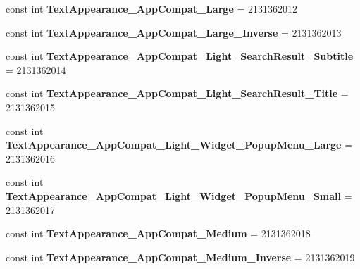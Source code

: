 \begin{DoxyCompactItemize}
\item 
\mbox{\label{classXaria_1_1Resource_1_1Style_adee01bac0b94e847200be1e34486bc75}} 
const int {\bfseries Text\+Appearance\+\_\+\+App\+Compat\+\_\+\+Large} = 2131362012
\item 
\mbox{\label{classXaria_1_1Resource_1_1Style_a69f6e5858e877fd085a7b790faa83b66}} 
const int {\bfseries Text\+Appearance\+\_\+\+App\+Compat\+\_\+\+Large\+\_\+\+Inverse} = 2131362013
\item 
\mbox{\label{classXaria_1_1Resource_1_1Style_a8970db975d003c7dd246b4aed41eb81a}} 
const int {\bfseries Text\+Appearance\+\_\+\+App\+Compat\+\_\+\+Light\+\_\+\+Search\+Result\+\_\+\+Subtitle} = 2131362014
\item 
\mbox{\label{classXaria_1_1Resource_1_1Style_a8789a5f17154f02872bf44ca2e65a2c7}} 
const int {\bfseries Text\+Appearance\+\_\+\+App\+Compat\+\_\+\+Light\+\_\+\+Search\+Result\+\_\+\+Title} = 2131362015
\item 
\mbox{\label{classXaria_1_1Resource_1_1Style_adaaaeb53b50517d52594d48f1a63f288}} 
const int {\bfseries Text\+Appearance\+\_\+\+App\+Compat\+\_\+\+Light\+\_\+\+Widget\+\_\+\+Popup\+Menu\+\_\+\+Large} = 2131362016
\item 
\mbox{\label{classXaria_1_1Resource_1_1Style_a4c80d173f319128b4d07390c6f9ad96c}} 
const int {\bfseries Text\+Appearance\+\_\+\+App\+Compat\+\_\+\+Light\+\_\+\+Widget\+\_\+\+Popup\+Menu\+\_\+\+Small} = 2131362017
\item 
\mbox{\label{classXaria_1_1Resource_1_1Style_a90c1c66755bc09b0895108db43934533}} 
const int {\bfseries Text\+Appearance\+\_\+\+App\+Compat\+\_\+\+Medium} = 2131362018
\item 
\mbox{\label{classXaria_1_1Resource_1_1Style_a259326d4529116808dd7ff38c4daf858}} 
const int {\bfseries Text\+Appearance\+\_\+\+App\+Compat\+\_\+\+Medium\+\_\+\+Inverse} = 2131362019
\item 
\mbox{\label{classXaria_1_1Resource_1_1Style_a6bf51281d553397efbd4a59087fa0bd1}} 

\end{DoxyCompactItemize}
